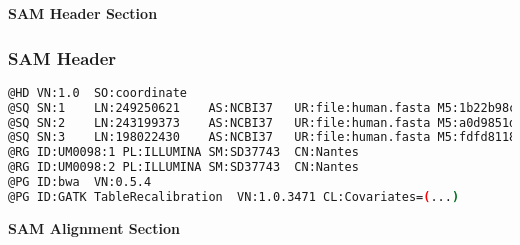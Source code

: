 \documentclass[xcolor=table]{beamer}
\newcommand{\centeredtitle}[1]{
\begin{center}
    \Huge{\bf{#1}}
\end{center}
}
\newcommand{\hugeslide}[1]{
\begin{frame}
\centeredtitle{#1}
\end{frame}
}
\begin{document}

\hugeslide{SAM Header Section}


\begin{frame}[fragile]
\frametitle{SAM Header}
\begin{framed}\tiny
\begin{lstlisting}[language=bash,basicstyle=\tiny]
@HD	VN:1.0	SO:coordinate
@SQ	SN:1	LN:249250621	AS:NCBI37	UR:file:human.fasta	M5:1b22b98cdeb4a9304cb5d48026a85128
@SQ	SN:2	LN:243199373	AS:NCBI37	UR:file:human.fasta	M5:a0d9851da00400dec1098a9255ac712e
@SQ	SN:3	LN:198022430	AS:NCBI37	UR:file:human.fasta	M5:fdfd811849cc2fadebc929bb925902e5
@RG	ID:UM0098:1	PL:ILLUMINA	SM:SD37743	CN:Nantes
@RG	ID:UM0098:2	PL:ILLUMINA	SM:SD37743	CN:Nantes
@PG	ID:bwa	VN:0.5.4
@PG	ID:GATK TableRecalibration	VN:1.0.3471	CL:Covariates=(...)
\end{lstlisting}
\end{framed}
\end{frame}

\hugeslide{SAM Alignment Section}
\end{document}
